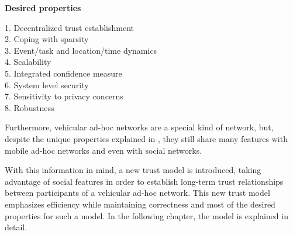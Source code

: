 \begin{table}[hpbt!]
\begin{flushleft}
	\begin{center} 
		\textbf{Desired properties} 
	\end{center}
	\hspace{10.5em} 1. Decentralized trust establishment\\
	\hspace{10.5em} 2. Coping with sparsity\\
	\hspace{10.5em} 3. Event/task and location/time dynamics\\
	\hspace{10.5em} 4. Scalability\\
	\hspace{10.5em} 5. Integrated confidence measure\\
	\hspace{10.5em} 6. System level security\\
	\hspace{10.5em} 7. Sensitivity to privacy concerns\\
	\hspace{10.5em} 8. Robustness
\end{flushleft}
\end{table}

Furthermore, vehicular ad-hoc networks are a special kind of network, but, despite the unique properties explained in , they still share many features with mobile ad-hoc networks and even with social networks.

With this information in mind, a new trust model is introduced, taking advantage of social features in order to establish long-term trust relationships between participants of a vehicular ad-hoc network.
This new trust model emphasizes efficiency while maintaining correctness and most of the desired properties for such a model.
In the following chapter, the model is explained in detail.


